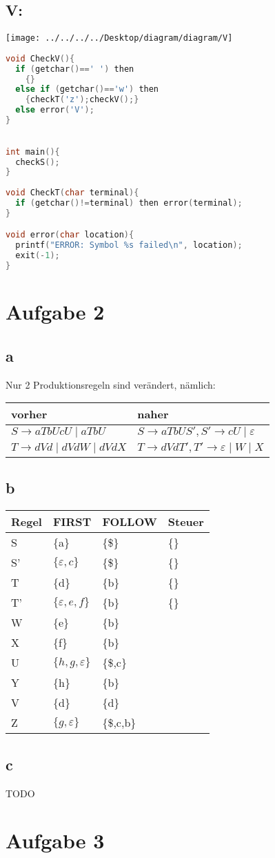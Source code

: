 \documentclass[11pt]{scrartcl}
\begin{document}
	\subsection*{V:}
	\begin{minipage}{0.5\textwidth}
		\texttt{[image: ../../../../Desktop/diagram/diagram/V]}
	\end{minipage}
	\begin{minipage}{0.6\textwidth}
		\begin{lstlisting}[language=C]		
void CheckV(){
  if (getchar()==' ') then 
    {}
  else if (getchar()=='w') then 
    {checkT('z');checkV();}
  else error('V');
}
		\end{lstlisting}
	\end{minipage}
\begin{lstlisting}[language=C]

int main(){
  checkS();
}
		
void CheckT(char terminal){
  if (getchar()!=terminal) then error(terminal);
}

void error(char location){
  printf("ERROR: Symbol %s failed\n", location);
  exit(-1);
}

\end{lstlisting}
	\section*{Aufgabe 2}
	\subsection*{a}
	Nur 2 Produktionsregeln sind verändert, nämlich:

	\begin{tabular}{l|l}
		vorher & naher \\ \hline
		$S \rightarrow aTbUcU \mid aTbU$ & 
		$S \rightarrow aTbUS', S'\rightarrow cU\mid \varepsilon$
		\\
		$T\rightarrow dVd \mid dVdW \mid dVdX$ & $T\rightarrow dVdT', T'\rightarrow \varepsilon\mid W \mid X$
	\end{tabular}
	\subsection*{b}
	\begin{tabular}{l|l|l|l}
		Regel & FIRST & FOLLOW & Steuer \\ \hline
		S & \{a\} & \{\$\} & \{\} \\
		S' & $\{\varepsilon,c\}$ & \{\$\} & \{\} \\
		T & \{d\} & \{b\}  & \{\} \\
		T' & $\{\varepsilon,e,f\}$ & \{b\}  & \{\} \\
		W & \{e\} & \{b\} & \\
		X & \{f\} & \{b\} & \\
		U & $\{h, g, \varepsilon\}$ & \{\$,c\} & \\
		Y & \{h\} & \{b\} & \\
		V & \{d\} & \{d\} & \\
		Z & $\{g,\varepsilon\}$ & \{\$,c,b\} &
	\end{tabular}
	\subsection*{c}
	TODO
	\section*{Aufgabe 3}
\end{document}
